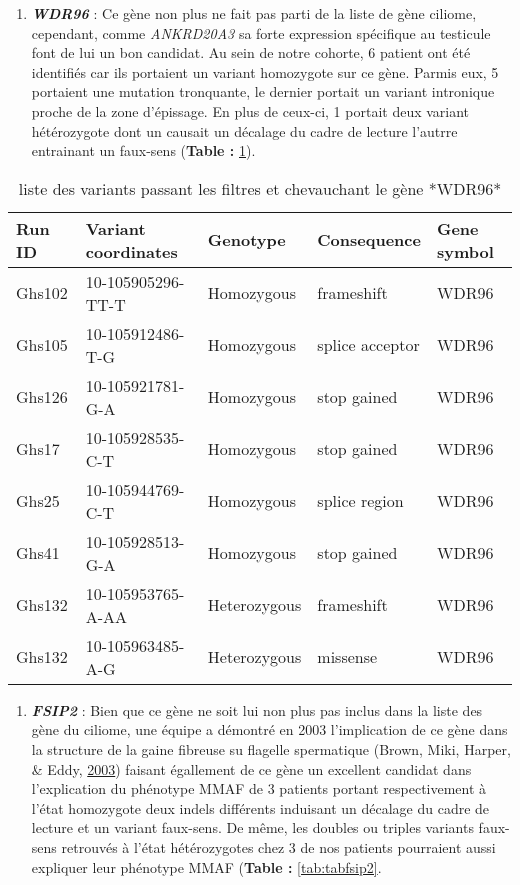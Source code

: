 \documentclass[12pt,twoside]{reedthesis}
\providecommand{\tightlist}{%
  \setlength{\itemsep}{0pt}\setlength{\parskip}{0pt}}
\theoremstyle{definition}
\theoremstyle{definition}
\theoremstyle{remark}
\begin{document}
  \begin{enumerate}
  \def\labelenumi{\arabic{enumi}.}
  \setcounter{enumi}{5}
  \tightlist
  \item
    \textbf{\emph{WDR96}} : Ce gène non plus ne fait pas parti de la liste
    de gène ciliome, cependant, comme \emph{ANKRD20A3} sa forte expression
    spécifique au testicule font de lui un bon candidat. Au sein de notre
    cohorte, 6 patient ont été identifiés car ils portaient un variant
    homozygote sur ce gène. Parmis eux, 5 portaient une mutation
    tronquante, le dernier portait un variant intronique proche de la zone
    d'épissage. En plus de ceux-ci, 1 portait deux variant hétérozygote
    dont un causait un décalage du cadre de lecture l'autrre entrainant un
    faux-sens (\textbf{Table : }\ref{tab:tabwdr96}).
  \end{enumerate}
  
  \newpage
  
  \begin{longtable}[t]{lllll}
  \caption{\label{tab:tabwdr96}liste des variants passant les filtres et chevauchant le gène *WDR96*}\\
  \toprule
  Run ID & Variant coordinates & Genotype & Consequence & Gene symbol\\
  \midrule
  Ghs102 & 10-105905296-TT-T & Homozygous & frameshift & WDR96\\
  Ghs105 & 10-105912486-T-G & Homozygous & splice acceptor & WDR96\\
  Ghs126 & 10-105921781-G-A & Homozygous & stop gained & WDR96\\
  Ghs17 & 10-105928535-C-T & Homozygous & stop gained & WDR96\\
  Ghs25 & 10-105944769-C-T & Homozygous & splice region & WDR96\\
  \addlinespace
  Ghs41 & 10-105928513-G-A & Homozygous & stop gained & WDR96\\
  Ghs132 & 10-105953765-A-AA & Heterozygous & frameshift & WDR96\\
  Ghs132 & 10-105963485-A-G & Heterozygous & missense & WDR96\\
  \bottomrule
  \end{longtable}
  
  \begin{enumerate}
  \def\labelenumi{\arabic{enumi}.}
  \setcounter{enumi}{6}
  \tightlist
  \item
    \textbf{\emph{FSIP2}} : Bien que ce gène ne soit lui non plus pas
    inclus dans la liste des gène du ciliome, une équipe a démontré en
    2003 l'implication de ce gène dans la structure de la gaine fibreuse
    su flagelle spermatique (Brown, Miki, Harper, \& Eddy,
    \protect\hyperlink{ref-Brown2003}{2003}) faisant égallement de ce gène
    un excellent candidat dans l'explication du phénotype MMAF de 3
    patients portant respectivement à l'état homozygote deux indels
    différents induisant un décalage du cadre de lecture et un variant
    faux-sens. De même, les doubles ou triples variants faux-sens
    retrouvés à l'état hétérozygotes chez 3 de nos patients pourraient
    aussi expliquer leur phénotype MMAF (\textbf{Table :
    }\ref{tab:tabfsip2}.
  \end{enumerate}
  
\end{document}
